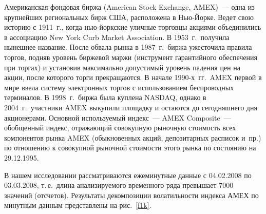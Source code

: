 \begin{multicols}{2}
Американская фондовая биржа (American Stock Exchange, AMEX)~---
одна из крупнейших региональных бирж США, расположена в Нью-Йорке.
Ведет свою историю с 1911~г., когда нью-йоркские уличные
торговцы акциями объединились в ассоциацию New York Curb Market
Association. В 1953~г.\ получила нынешнее название. После обвала
рынка в 1987~г.\ биржа ужесточила правила торгов, подняв уровень
биржевой маржи (инструмент гарантийного обеспечения при торгах) и
установив максимально допустимый уровень падения цен на акции,
после которого торги прекращаются. В начале 1990-х~гг.\ AMEX
первой в мире ввела систему электронных торгов с использованием
беспроводных терминалов. В 1998~г.\ биржа была куплена NASDAQ,
однако в 2004~г.\ участники AMEX выкупили площадку и остаются до
сегодняшнего дня акционерами. Основной используемый индекс~--- AMEX
Composite~--- обобщенный индекс, отражающий совокупную рыночную
стоимость всех компонентов рынка AMEX (обыкновенных акций,
депозитарных расписок и~пр.) по отношению к совокупной рыночной
стоимости этого рынка по состоянию на 29.12.1995.

В нашем исследовании рассматриваются ежеминутные данные с
04.02.2008 по 03.03.2008, т.\,е.\ длина анализируемого временного
ряда превышает 7000 значений (отсчетов). Результаты декомпозиции
волатильности индекса АМЕХ по минутным данным представлены на рис.~\ref{f1k}.

\begin{figure*} %
\vspace*{1pt}
\begin{center}
\mbox{%
\epsfxsize=104.223mm
}
\end{center}
\vspace*{-9pt}
\end{figure*}


\end{multicols}
